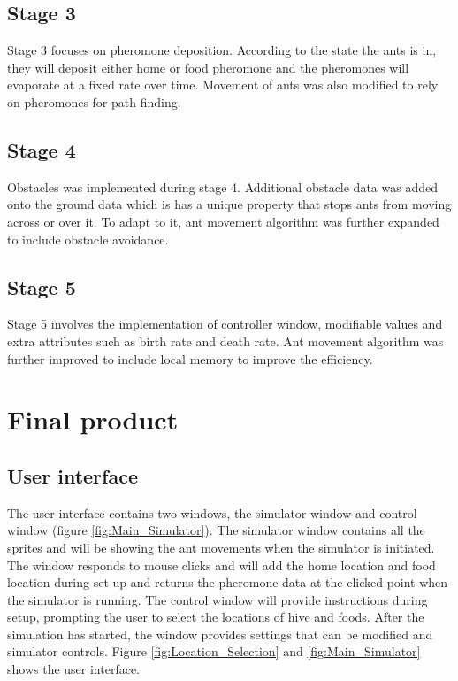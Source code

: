 \documentclass[a4paper, oneside, 11pt]{report}
\begin{document}
\subsection{Stage 3}
Stage 3 focuses on pheromone deposition. According to the state the ants is in, they will deposit either home or food pheromone and the pheromones will evaporate at a fixed rate over time. Movement of ants was also modified to rely on pheromones for path finding.

\subsection{Stage 4}
Obstacles was implemented during stage 4. Additional obstacle data was added onto the ground data which is has a unique property that stops ants from moving across or over it. To adapt to it, ant movement algorithm was further expanded to include obstacle avoidance.

\subsection{Stage 5}
Stage 5 involves the implementation of controller window, modifiable values and extra attributes such as birth rate and death rate. Ant movement algorithm was further improved to include local memory to improve the efficiency.

\section{Final product}
\subsection{User interface}
The user interface contains two windows, the simulator window and control window (figure \ref{fig:Main_Simulator}). The simulator window contains all the sprites and will be showing the ant movements when the simulator is initiated. The window responds to mouse clicks and will add the home location and food location during set up and returns the pheromone data at the clicked point when the simulator is running. The control window will provide instructions during setup, prompting the user to select the locations of hive and foods. After the simulation has started, the window provides settings that can be modified and simulator controls. Figure \ref{fig:Location_Selection} and \ref{fig:Main_Simulator} shows the user interface.
\end{document}
